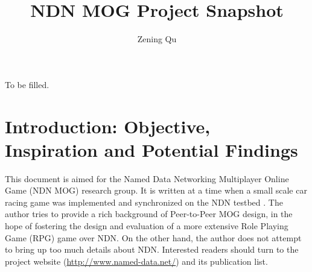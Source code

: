 \documentclass{article}
\begin{document}
\title{NDN MOG Project Snapshot}
\author{Zening Qu}
\maketitle

\abstract
To be filled.

\tableofcontents
\listoffigures
\listoftables
\newpage

\section{Introduction: Objective, Inspiration and Potential Findings}
\label{itro}


This document is aimed for the Named Data Networking Multiplayer Online Game (NDN MOG) research group. It is written at a time when a small scale car racing game was implemented and synchronized on the NDN testbed \cite{egalcar}. The author tries to provide a rich background of Peer-to-Peer MOG design, in the hope of fostering the design and evaluation of a more extensive Role Playing Game (RPG) game over NDN. On the other hand, the author does not attempt to bring up too much details about NDN. Interested readers should turn to the project website (\href{http://www.named-data.net/}{http://www.named-data.net/}) and its publication list.
\end{document}
